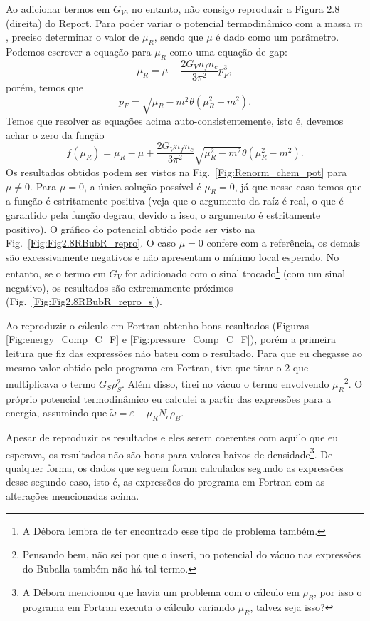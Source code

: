 Ao adicionar termos em $G_V$, no entanto, não consigo reproduzir a Figura 2.8 (direita) do Report. Para poder variar o potencial termodinâmico com a massa $m$, preciso determinar o valor de $\mu_R$, sendo que $\mu$ é dado como um parâmetro. Podemos escrever a equação para $\mu_R$ como uma equação de gap:
\begin{equation}\label{Eq:Renorm_chem_pot_auto_1}
	\mu_R = \mu - \frac{2G_V n_fn_c}{3\pi^2}p_F^3,
\end{equation}
%
porém, temos que
\begin{equation}\label{Eq:Renorm_chem_pot_auto_2}
	p_F = \sqrt{\mu_R - m^2} \theta(\mu_R^2 - m^2).
\end{equation}
%
Temos que resolver as equações acima auto-consistentemente, isto é, devemos achar o zero da função
\begin{equation}
	f(\mu_R) = \mu_R - \mu + \frac{2G_V n_fn_c}{3\pi^2} \sqrt{\mu_R^2 - m^2}\theta(\mu_R^2 - m^2).
\end{equation}
%
Os resultados obtidos podem ser vistos na Fig.~\ref{Fig:Renorm_chem_pot} para $\mu \neq 0$. Para $\mu = 0$, a única solução possível é $\mu_R = 0$, já que nesse caso temos que a função é estritamente positiva (veja que o argumento da raíz é real, o que é garantido pela função degrau; devido a isso, o argumento é estritamente positivo). O gráfico do potencial obtido pode ser visto na Fig.~\ref{Fig:Fig2.8RBubR_repro}. O caso $\mu = 0$ confere com a referência, os demais são excessivamente negativos e não apresentam o mínimo local esperado. No entanto, se o termo em $G_V$ for adicionado com o sinal trocado\footnote{A Débora lembra de ter encontrado esse tipo de problema também.} (com um sinal negativo), os resultados são extremamente próximos (Fig.~\ref{Fig:Fig2.8RBubR_repro_s}).

Ao reproduzir o cálculo em Fortran obtenho bons resultados (Figuras \ref{Fig:energy_Comp_C_F} e \ref{Fig:pressure_Comp_C_F}), porém a primeira leitura que fiz das expressões não bateu com o resultado. Para que eu chegasse ao mesmo valor obtido pelo programa em Fortran, tive que tirar o 2 que multiplicava o termo $G_S \rho_S^2$. Além disso, tirei no vácuo o termo envolvendo $\mu_R$\footnote{Pensando bem, não sei por que o inseri, no potencial do vácuo nas expressões do Buballa também não há tal termo.}. O próprio potencial termodinâmico eu calculei a partir das expressões para a energia, assumindo que $\tilde{\omega} = \varepsilon - \mu_R N_c \rho_B$.
	
Apesar de reproduzir os resultados e eles serem coerentes com aquilo que eu esperava, os resultados não são bons para valores baixos de densidade\footnote{A Débora mencionou que havia um problema com o cálculo em $\rho_B$, por isso o programa em Fortran executa o cálculo variando $\mu_R$, talvez seja isso?}. De qualquer forma, os dados que seguem foram calculados segundo as expressões desse segundo caso, isto é, as expressões do programa em Fortran com as alterações mencionadas acima. 

